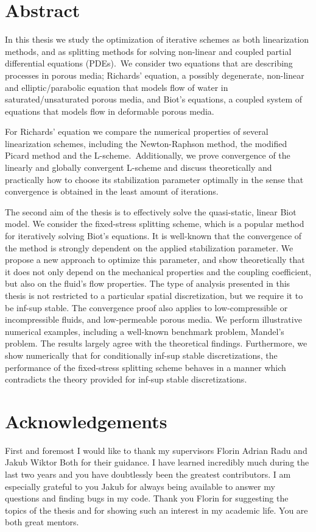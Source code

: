 \documentclass[../Main/main.tex]{subfiles}
\begin{document}
\section*{Abstract}
\markboth{}{}
In this thesis we study the optimization of iterative schemes as both linearization methods, and as splitting methods for solving non-linear and coupled partial differential equations (PDEs).\ We consider two equations that are describing processes in porous media; Richards' equation, a possibly degenerate, non-linear and elliptic/parabolic equation that models flow of water in saturated/unsaturated porous media, and Biot's equations, a coupled system of equations that models flow in deformable porous media. 

For Richards' equation we compare the numerical properties of several linearization schemes, including the Newton-Raphson method, the modified Picard method and the L-scheme.\ Additionally, we prove convergence of the linearly and globally convergent L-scheme and discuss theoretically and practically how to choose its stabilization parameter optimally in the sense that convergence is obtained in the least amount of iterations. 

The second aim of the thesis is to effectively solve the quasi-static, linear Biot model. We consider the fixed-stress splitting scheme, which is a popular method for iteratively solving Biot's equations. It is  well-known that the convergence of the method is strongly dependent on the applied stabilization parameter. We propose a new approach to optimize this parameter, and show theoretically that it does not only depend on the mechanical properties and the coupling coefficient, but also on the fluid's flow properties. The type of analysis presented in this thesis is not restricted to a particular spatial discretization, but we require it to be inf-sup stable. The convergence proof also applies to low-compressible or incompressible fluids, and low-permeable porous media. We perform illustrative numerical examples, including a well-known benchmark problem, Mandel's problem. The results largely agree with the theoretical findings. Furthermore, we show numerically that for conditionally inf-sup stable discretizations, the performance of the fixed-stress splitting scheme behaves in a manner which contradicts the theory provided for inf-sup stable discretizations. 
\newpage
\section*{Acknowledgements}
First and foremost I would like to thank my supervisors Florin Adrian Radu and Jakub Wiktor Both for their guidance. I have learned incredibly much during the last two years and you have doubtlessly been the greatest contributors. I am especially grateful to you Jakub for always being available to answer my questions and finding bugs in my code. Thank you Florin for suggesting the topics of the thesis and for showing such an interest in my academic life. You are both great mentors.
\end{document}
